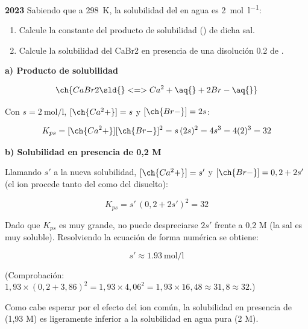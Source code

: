 \begin{exerciseEVAU}
    \textbf{2023} Sabiendo que a \SI{298}{\kelvin}, la solubilidad del  en agua es \SI{2}{\mole\per\litre}:
    \begin{enumerate}[label=\letraminuscula]
        \item Calcule la constante del producto de solubilidad (\Kps{}) de dicha sal.
        \item Calcule la solubilidad del CaBr2 en presencia de una disolución \SI{0.2}{\M} de .
    \end{enumerate}

    \begin{solu}

        \textbf{a) Producto de solubilidad}

        \begin{equation*}
            \ch{CaBr2 \sld{} <=> Ca^2+ \aq{} + 2 Br- \aq{}}
        \end{equation*}

        Con \(s = \SI{2}{\mole\per\litre}\), \([\ch{Ca^2+}] = s\) y \([\ch{Br-}] = 2s\):

        \begin{equation*}
            K_{ps} = [\ch{Ca^2+}][\ch{Br-}]^2 = s\, (2s)^2 = 4 s^3 = 4 (2)^3 = 32
        \end{equation*}

        \textbf{b) Solubilidad en presencia de  0,2 M}

        Llamando \(s'\) a la nueva solubilidad, \([\ch{Ca^2+}] = s'\) y \([\ch{Br-}] = 0,2 + 2s'\) (el ion  procede tanto del  como del  disuelto):

        \begin{equation*}
            K_{ps} = s'\, (0,2 + 2s')^2 = 32
        \end{equation*}

        Dado que \(K_{ps}\) es muy grande, no puede despreciarse \(2s'\) frente a 0,2 M (la sal es muy soluble). Resolviendo la ecuación de forma numérica se obtiene:

        \begin{equation*}
            s' \approx \SI{1.93}{\mole\per\litre}
        \end{equation*}

        (Comprobación: \(1,93 \times (0,2 + 3,86)^2 = 1,93 \times 4,06^2 = 1,93 \times 16,48 \approx 31,8 \approx 32\).)

        Como cabe esperar por el efecto del ion común, la solubilidad en presencia de  (1,93 M) es ligeramente inferior a la solubilidad en agua pura (2 M).

    \end{solu}
\end{exerciseEVAU}

